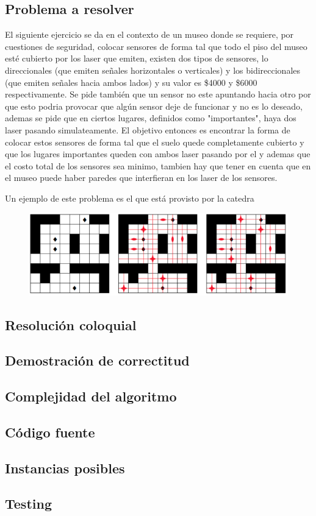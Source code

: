 \subsection{Problema a resolver}

El siguiente ejercicio se da en el contexto de un museo donde se requiere, por cuestiones de seguridad, colocar sensores de forma tal que todo el piso del museo esté cubierto por los laser que emiten, existen dos tipos de sensores, lo direccionales (que emiten señales horizontales o verticales) y los bidireccionales (que emiten señales hacia ambos lados) y su valor es \$4000 y \$6000 respectivamente. Se pide también que un sensor no este apuntando hacia otro por que esto podria provocar que algún sensor deje de funcionar y no es lo deseado, ademas se pide que en ciertos lugares, definidos como "importantes", haya dos laser pasando simulateamente. El objetivo entonces es encontrar la forma de colocar estos sensores de forma tal que el suelo quede completamente cubierto y que los lugares importantes queden con ambos laser pasando por el y ademas que el costo total de los sensores sea minimo, tambien hay que tener en cuenta que en el museo puede haber paredes que interfieran en los laser de los sensores.

Un ejemplo de este problema es el que está provisto por la catedra


\begin{figure}[H] %
	\begin{center}
		\includegraphics[width=320pt]{../imgs/ej3_ejemploCatedra.png}
	\end{center}
\end{figure}


\subsection{Resolución coloquial}

\subsection{Demostración de correctitud}

\subsection{Complejidad del algoritmo}

\subsection{Código fuente}

\subsection{Instancias posibles}

\subsection{Testing}
